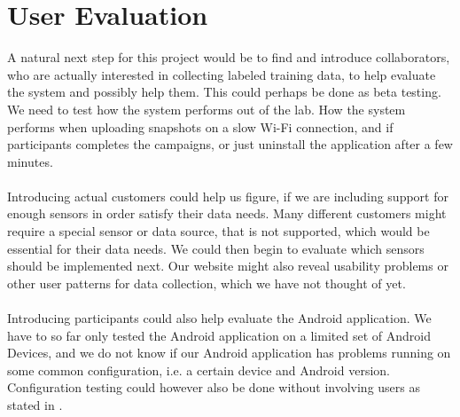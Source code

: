 \section{User Evaluation}

A natural next step for this project would be to find and introduce collaborators, who are actually interested in collecting labeled training data, to help evaluate the system and possibly help them. This could perhaps be done as beta testing. We need to test how the system performs out of the lab. How the system performs when uploading snapshots on a slow Wi-Fi connection, and if participants completes the campaigns, or just uninstall the application after a few minutes.
\\\\
Introducing actual customers could help us figure, if we are including support for enough sensors in order satisfy their data needs. Many different customers might require a special sensor or data source, that is not supported, which would be essential for their data needs. We could then begin to evaluate which sensors should be implemented next. Our website might also reveal usability problems or other user patterns for data collection, which we have not thought of yet.
\\\\
Introducing participants could also help evaluate the Android application. We have to so far only tested the Android application on a limited set of Android Devices, and we do not know if our Android application has problems running on some common configuration, i.e. a certain device and Android version. Configuration testing could however also be done without involving users as stated in .  